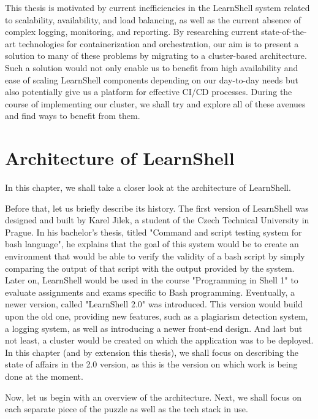 \documentclass[thesis=B,english]{FITthesis}[2019/12/23]
\begin{document}
This thesis is motivated by current inefficiencies in the LearnShell system related to scalability, availability, and load balancing, as well as the current absence of complex logging, monitoring, and reporting. By researching current state-of-the-art technologies for containerization and orchestration, our aim is to present a solution to many of these problems by migrating to a cluster-based architecture. Such a solution would not only enable us to benefit from high availability and ease of scaling LearnShell components depending on our day-to-day needs but also potentially give us a platform for effective CI/CD processes. During the course of implementing our cluster, we shall try and explore all of these avenues and find ways to benefit from them.


\chapter{Architecture of LearnShell}

In this chapter, we shall take a closer look at the architecture of LearnShell.

Before that, let us briefly describe its history. The first version of LearnShell was designed and built by Karel Jilek, a student of the Czech Technical University in Prague. In his bachelor's thesis, titled "Command and script testing system for bash language", he explains that the goal of this system would be to create an environment that would be able to verify the validity of a bash script by simply comparing the output of that script with the output provided by the system. \cite{learnshell-jilek} Later on, LearnShell would be used in the course "Programming in Shell 1" to evaluate assignments and exams specific to Bash programming. Eventually, a newer version, called "LearnShell 2.0" was introduced. This version would build upon the old one, providing new features, such as a plagiarism detection system, a logging system, as well as introducing a newer front-end design. And last but not least, a cluster would be created on which the application was to be deployed. In this chapter (and by extension this thesis), we shall focus on describing the state of affairs in the 2.0 version, as this is the version on which work is being done at the moment.

Now, let us begin with an overview of the architecture. Next, we shall focus on each separate piece of the puzzle as well as the tech stack in use.

\clearpage
\end{document}
